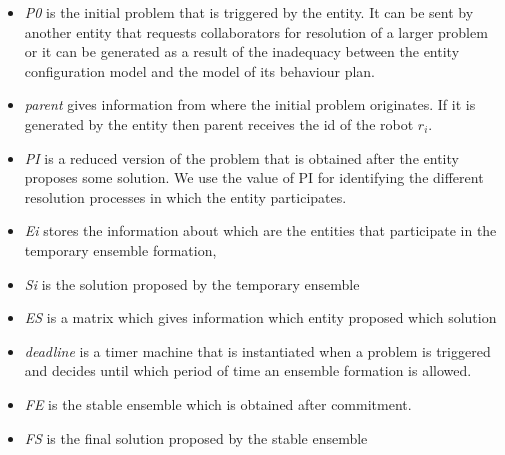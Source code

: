 \documentclass[journal]{IEEEtran}
\theoremstyle{definition}
\begin{document}
\begin{itemize}
\item \textit{P0} is the initial problem that is triggered by the entity. It can be sent by another entity that requests collaborators for resolution of a larger problem or 
it can be generated as a result of the inadequacy between the entity configuration model and the model of its behaviour plan.
\item \textit{parent} gives information from where the initial problem originates. If it is generated by the entity then parent receives the id of the robot $r_i$.
\item \textit{PI} is a reduced version of the problem that is obtained after the entity proposes some solution. We use the value of PI for identifying the different resolution processes in which the entity participates.
\item \textit{Ei} stores the information about which are the entities that participate in the temporary ensemble formation, 
\item \textit{Si} is the solution proposed by the temporary ensemble 
\item \textit{ES} is a matrix which gives information which entity proposed which solution
\item \textit{deadline} is a timer machine that is instantiated when a problem is triggered and decides until which period of time an ensemble formation is allowed.
\item \textit{FE} is the stable ensemble which is obtained after commitment.
\item \textit{FS} is the final solution proposed by the stable ensemble
\end{itemize}






\end{document}
